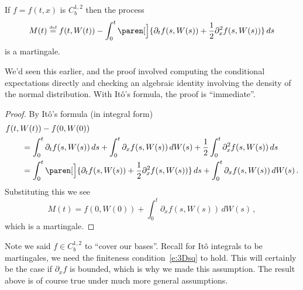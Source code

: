 \begin{proposition}
  If $f = f(t, x)$ is $C^{1,2}_b$ then the process
  \begin{equation*}
    M(t) \defeq f(t, W(t))
      - \int_0^t \paren[\Big]{
	  \partial_t f(s, W(s)) + \frac{1}{2} \partial_x^2 f(s, W(s))
	} \, ds
  \end{equation*}
  is a martingale.
\end{proposition}
\begin{remark}
  We'd seen this earlier, and the proof involved computing the conditional expectations directly and checking an algebraic identity involving the density of the normal distribution.
  With It\^o's formula, the proof is ``immediate''.
\end{remark}
\begin{proof}
  By It\^o's formula (in integral form)
  \begin{align*}
    \MoveEqLeft
    f(t, W(t)) - f(0, W(0))
    \\
      &= \int_0^t \partial_t f(s, W(s)) \, ds
	+ \int_0^t \partial_x f( s, W(s)) \, dW(s)
	+ \frac{1}{2} \int_0^t \partial_x^2 f(s, W(s)) \, ds
    \\
      &= \int_0^t \paren[\Big]{
	      \partial_t f(s, W(s))
	      + \frac{1}{2} \partial_x^2 f(s, W(s))
	    } \, ds
	  + \int_0^t \partial_x f( s, W(s)) \, dW(s)\,.
  \end{align*}
  Substituting this we see
  \begin{equation*}
    M(t) = f(0, W(0))
	  + \int_0^t \partial_x f( s, W(s)) \, dW(s)\,,
  \end{equation*}
  which is a martingale.
\end{proof}
\begin{remark}
  Note we said $f \in C^{1,2}_b$ to ``cover our bases''.
  Recall for It\^o integrals to be martingales, we need the finiteness condition~\eqref{e:3Dsq} to hold.
  This will certainly be the case if $\partial_x f$ is bounded, which is why we made this assumption.
  The result above is of course true under much more general assumptions.
\end{remark}

